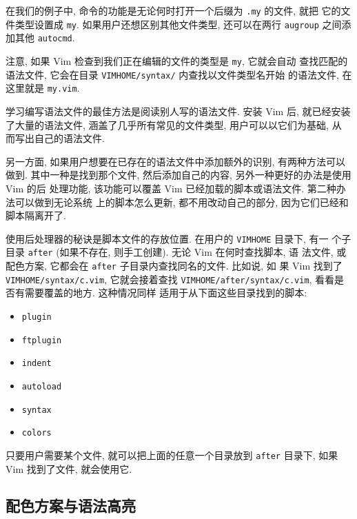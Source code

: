 在我们的例子中, 命令的功能是无论何时打开一个后缀为 \texttt{.my} 的文件, 就把
它的文件类型设置成 \texttt{my}. 如果用户还想区别其他文件类型, 还可以在两行
\texttt{augroup} 之间添加其他 \texttt{autocmd}.

注意, 如果 Vim 检查到我们正在编辑的文件的类型是 \texttt{my}, 它就会自动
查找匹配的语法文件, 它会在目录 \texttt{VIMHOME/syntax/} 内查找以文件类型名开始
的语法文件, 在这里就是 \texttt{my.vim}.


\begin{warning}
    学习编写语法文件的最佳方法是阅读别人写的语法文件. 安装 Vim 后, 就已经安装
    了大量的语法文件, 涵盖了几乎所有常见的文件类型, 用户可以以它们为基础, 从
    而写出自己的语法文件.
\end{warning}

另一方面, 如果用户想要在已存在的语法文件中添加额外的识别, 有两种方法可以做到.
其中一种是找到那个文件, 然后添加自己的内容, 另外一种更好的办法是使用 Vim 的后
处理功能, 该功能可以覆盖 Vim 已经加载的脚本或语法文件. 第二种办法可以做到无论系统
上的脚本怎么更新, 都不用改动自己的部分, 因为它们已经和脚本隔离开了.

使用后处理器的秘诀是脚本文件的存放位置. 在用户的 \texttt{VIMHOME} 目录下, 有一
个子目录 \texttt{after} (如果不存在, 则手工创建). 无论 Vim 在何时查找脚本, 语
法文件, 或配色方案, 它都会在 \texttt{after} 子目录内查找同名的文件. 比如说, 如
果 Vim 找到了 \texttt{VIMHOME/syntax/c.vim}, 它就会接着查找
\texttt{VIMHOME/after/syntax/c.vim}, 看看是否有需要覆盖的地方. 这种情况同样
适用于从下面这些目录找到的脚本:
\begin{itemize}
    \item \texttt{plugin}
    \item \texttt{ftplugin}
    \item \texttt{indent}
    \item \texttt{autoload}
    \item \texttt{syntax}
    \item \texttt{colors}
\end{itemize}
只要用户需要某个文件, 就可以把上面的任意一个目录放到 \texttt{after} 目录下,
如果 Vim 找到了文件, 就会使用它.

\subsection{配色方案与语法高亮}
\label{subsec:color_scheme_and_syntax_coloring}

